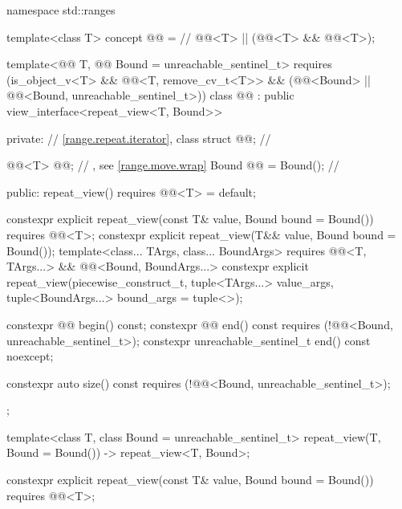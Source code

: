 \begin{codeblock}
namespace std::ranges {
  template<class T>
    concept @@ =  // \expos
      @@<T> || (@@<T> && @@<T>);

  template<@@ T, @@ Bound = unreachable_sentinel_t>
    requires (is_object_v<T> && @@<T, remove_cv_t<T>> &&
              (@@<Bound> ||
               @@<Bound, unreachable_sentinel_t>))
  class @@ : public view_interface<repeat_view<T, Bound>> {
  private:
    // \ref{range.repeat.iterator}, class 
    struct @@;                            // \expos

    @@<T> @@;                      // \expos, see \ref{range.move.wrap}
    Bound @@ = Bound();                     // \expos

  public:
    repeat_view() requires @@<T> = default;

    constexpr explicit repeat_view(const T& value, Bound bound = Bound())
      requires @@<T>;
    constexpr explicit repeat_view(T&& value, Bound bound = Bound());
    template<class... TArgs, class... BoundArgs>
      requires @@<T, TArgs...> &&
               @@<Bound, BoundArgs...>
    constexpr explicit repeat_view(piecewise_construct_t,
      tuple<TArgs...> value_args, tuple<BoundArgs...> bound_args = tuple<>{});

    constexpr @@ begin() const;
    constexpr @@ end() const requires (!@@<Bound, unreachable_sentinel_t>);
    constexpr unreachable_sentinel_t end() const noexcept;

    constexpr auto size() const requires (!@@<Bound, unreachable_sentinel_t>);
  };

  template<class T, class Bound = unreachable_sentinel_t>
    repeat_view(T, Bound = Bound()) -> repeat_view<T, Bound>;
}
\end{codeblock}

%
\begin{itemdecl}
constexpr explicit repeat_view(const T& value, Bound bound = Bound())
  requires @@<T>;
\end{itemdecl}

